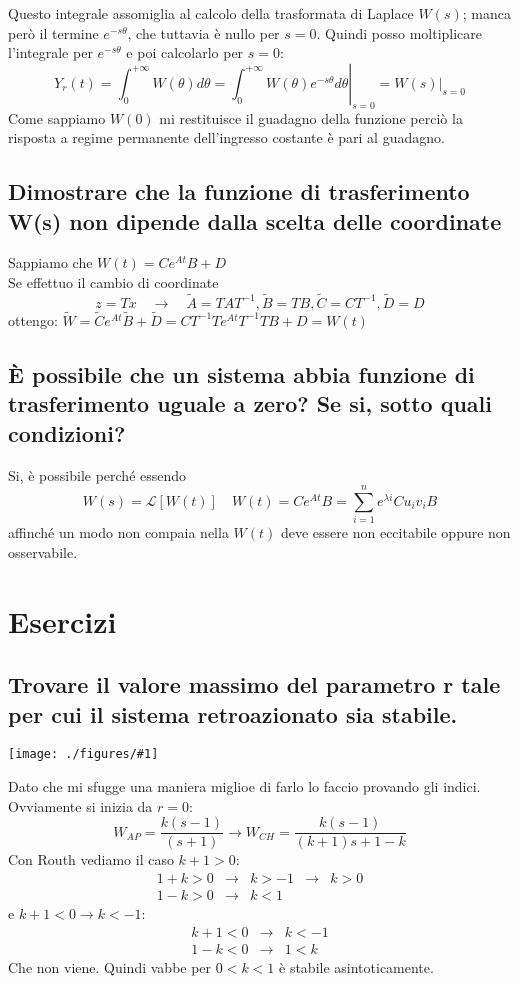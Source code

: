 \documentclass{article}
\newcommand{\incfig}[2]{%
	\texttt{[image: ./figures/\#1]}%
}
\begin{document}
Questo integrale assomiglia al calcolo della trasformata di Laplace $W(s)$;
manca però il termine $e^{-s\theta}$, che tuttavia è nullo per $s=0$.
Quindi posso moltiplicare l'integrale per  $e^{-s\theta}$ e poi calcolarlo per $s=0$:
\[ 
    Y_r(t)=\int_{0}^{+\infty}W(\theta) d\theta =\left. \int_{0}^{+\infty}W(\theta) e^{-s\theta} d\theta \right|_{s=0} =\left. W(s)\right|_{s=0}
\]
Come sappiamo $W(0)$ mi restituisce il guadagno della funzione perciò la risposta a regime permanente dell'ingresso costante è pari al guadagno.

\subsection{Dimostrare che la funzione di trasferimento W(s) non dipende dalla scelta delle coordinate}
Sappiamo che $W(t) = Ce^{At}B+D$\\
Se effettuo il cambio di coordinate 
\[ z=Tx \quad \to \quad \widetilde{A}=TAT^{-1}, \widetilde{B}=TB, \widetilde{C}=CT^{-1}, \widetilde{D}=D\]
ottengo:
$\widetilde{W}=\widetilde{C}e^{At}\widetilde{B}+\widetilde{D}=CT^{-1}Te^{At}T^{-1}TB+D=W(t)$

\subsection{È possibile che un sistema abbia funzione di trasferimento uguale a zero? Se si, sotto
quali condizioni?}
Si, è possibile perché essendo 
\[ W(s)=\mathscr{L}[W(t)] \quad W(t)=Ce^{At}B=\sum_{i=1}^{n}e^{\lambda i}Cu_iv_iB \]
affinché un modo non compaia nella $W(t)$ deve essere non eccitabile oppure non osservabile.






\section{Esercizi}

\subsection{Trovare il valore massimo del parametro r tale per cui il sistema retroazionato sia stabile. }

\incfig{sistema.jpeg}{1.2}

Dato che mi sfugge una maniera miglioe di farlo lo faccio provando gli indici. Ovviamente si inizia da $r=0$:
\[ 
    W_{AP} = \frac{k(s-1)}{(s+1)} \to W_{CH} = \frac{k(s-1)}{(k+1)s+1-k}
\]
Con Routh vediamo il caso $k+1>0$:
\begin{align*}
    1+k >0 &\to& k>-1&\to& k >0\\
    1-k >0 &\to& k<1
\end{align*}
e $k+1 < 0\to k <-1$:
\begin{align*}
    k+1 <0 &\to& k < -1\\
    1-k <0 &\to& 1<k 
\end{align*} 
Che non viene.
Quindi vabbe per $0<k<1$ è stabile asintoticamente.
\end{document}
